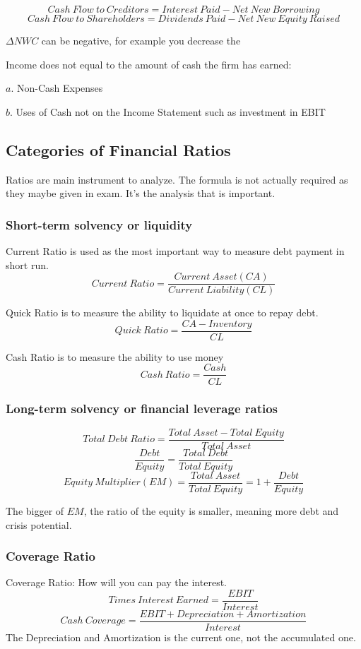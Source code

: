 \documentclass[10pt, a4paper]{article}
\begin{document}
        $$Cash\ Flow\ to\ Creditors = Interest\ Paid - Net\ New\ Borrowing$$
        $$Cash\ Flow\ to\ Shareholders = Dividends\ Paid - Net\ New\ Equity\ Raised$$

        $\Delta NWC$ can be negative, for example you decrease the 


        Income does not equal to the amount of cash the firm has earned:

            $a$. Non-Cash Expenses
        
            $b$. Uses of Cash not on the Income Statement such as investment in EBIT
    
    \subsection{Categories of Financial Ratios}
        Ratios are main instrument to analyze. The formula is not actually required as they maybe given in exam. It's the analysis that is important. 
        
        \subsubsection{Short-term solvency or liquidity}
        Current Ratio is used as the most important way to measure debt payment in short run.
        $$Current\ Ratio = \frac{Current\ Asset(CA)}{Current\ Liability(CL)}$$

        Quick Ratio is to measure the ability to liquidate at once to repay debt.
        $$Quick\ Ratio = \frac{CA - Inventory}{CL}$$
        
        Cash Ratio is to measure the ability to use money 
        $$Cash\ Ratio = \frac{Cash}{CL}$$

        \subsubsection{Long-term  solvency or financial leverage ratios}
        $$Total\ Debt\ Ratio = \frac{Total\ Asset - Total\ Equity}{Total\ Asset}$$
        $$\frac{Debt}{Equity} = \frac{Total\ Debt}{Total\ Equity}$$
        $$Equity\ Multiplier (EM) = \frac{Total\ Asset}{Total\ Equity} = 1 + \frac{Debt}{Equity}$$

        The bigger of $EM$, the ratio of the equity is smaller, meaning more debt and crisis potential. 
        \subsubsection{Coverage Ratio}
        Coverage Ratio: How will you can pay the interest. 
        $$Times\ Interest\ Earned = \frac{EBIT}{Interest}$$
        $$Cash\ Coverage = \frac{EBIT + Depreciation + Amortization}{Interest}$$
        The Depreciation and Amortization is the current one, not the accumulated one. 
        
\end{document}
